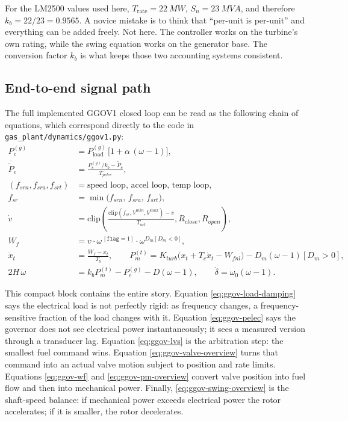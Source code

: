 \documentclass[11pt]{article}
\begin{document}
For the LM2500 values used here, $T_\text{rate} = \SI{22}{MW}$,
$S_n = \SI{23}{MVA}$, and therefore $k_b = 22/23 = 0.9565$. A novice
mistake is to think that ``per-unit is per-unit'' and everything can be
added freely. Not here. The controller works on the turbine's own rating,
while the swing equation works on the generator base. The conversion
factor $k_b$ is what keeps those two accounting systems consistent.

\subsection{End-to-end signal path}
The full implemented GGOV1 closed loop can be read as the following chain
of equations, which correspond directly to the code in
\texttt{gas\_plant/dynamics/ggov1.py}:
\begin{align}
  P_e^{(g)} &= P_{\text{load}}^{(g)}\,\bigl[1 + \alpha\,(\omega-1)\bigr],
    \label{eq:ggov-load-damping}\\
  \dot{\tilde P_e} &= \frac{P_e^{(g)}/k_b - \tilde P_e}{T_{pelec}},
    \label{eq:ggov-pelec}\\
  (f_{srn}, f_{sra}, f_{srt}) &=
    \text{speed loop, accel loop, temp loop},\\
  f_{sr} &= \min\bigl(f_{srn},\,f_{sra},\,f_{srt}\bigr),
    \label{eq:ggov-lvs}\\
  \dot v &= \text{clip}\!\left(
    \frac{\text{clip}(f_{sr},V^{min},V^{max}) - v}{T_{act}},
    R_{close}, R_{open}\right),
    \label{eq:ggov-valve-overview}\\
  W_f &= v\cdot\omega^{\,[\texttt{flag}=1]}\cdot\omega^{D_m[D_m<0]},
    \label{eq:ggov-wf}\\
  \dot x_t &= \frac{W_f - x_t}{T_b},
    \qquad
    P_m^{(t)} = K_{turb}\bigl(x_t + T_c\dot x_t - W_{fnl}\bigr)
      - D_m(\omega-1)[D_m>0],
    \label{eq:ggov-pm-overview}\\
  2H\,\dot\omega &= k_b P_m^{(t)} - P_e^{(g)} - D(\omega-1),
    \qquad
    \dot\delta = \omega_0(\omega-1).
    \label{eq:ggov-swing-overview}
\end{align}

This compact block contains the entire story. Equation
\eqref{eq:ggov-load-damping} says the electrical load is not perfectly
rigid: as frequency changes, a frequency-sensitive fraction of the load
changes with it. Equation \eqref{eq:ggov-pelec} says the governor does not
see electrical power instantaneously; it sees a measured version through a
transducer lag. Equation \eqref{eq:ggov-lvs} is the arbitration step: the
smallest fuel command wins. Equation \eqref{eq:ggov-valve-overview} turns
that command into an actual valve motion subject to position and rate
limits. Equations \eqref{eq:ggov-wf} and \eqref{eq:ggov-pm-overview}
convert valve position into fuel flow and then into mechanical power.
Finally, \eqref{eq:ggov-swing-overview} is the shaft-speed balance: if
mechanical power exceeds electrical power the rotor accelerates; if it is
smaller, the rotor decelerates.
\end{document}
